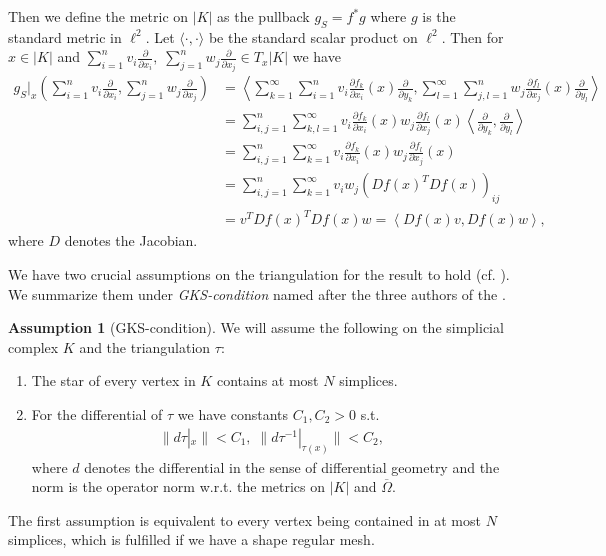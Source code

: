 \documentclass[12pt,a4paper]{article}
\theoremstyle{definition}
\newtheorem{assumption}{Assumption}
\newcommand{\omegabar}{\overline{\Omega}}
\begin{document}
Then we define the metric on $|K|$ as the pullback $g_S = f^*g$ 
where $g$ is the standard metric in $\ell^2$. Let $\langle \cdot , 
\cdot \rangle$ be the standard scalar product on $\ell^2$. Then for $x \in |K|$ 
and $\sum_{i=1}^n v_i \frac{\partial}{\partial x_i}, \; 
\sum_{j=1}^n w_j \frac{\partial}{\partial x_j} \in T_x |K|$ we have 
\begin{align*}
g_S|_x\left(\sum_{i=1}^n v_i \frac{\partial}{\partial x_i}, 
\sum_{j=1}^n w_j \frac{\partial}{\partial x_j}\right) &= 
\left\langle \sum_{k=1}^\infty \sum_{i=1}^n v_i 
\frac{\partial f_k}{\partial x_i} (x)
\frac{\partial }{\partial y_k}, 
\sum_{l=1}^\infty \sum_{j,l=1}^n w_j \frac{\partial f_l}{\partial x_j} (x)
\frac{\partial }{\partial y_l} \right\rangle \\   
&= \sum_{i,j=1}^n \sum_{k,l=1}^\infty v_i \frac{\partial f_k}{\partial x_i} (x)
w_j \frac{\partial f_l}{\partial x_j} (x) 
\left\langle \frac{\partial }{\partial y_k}, \frac{\partial }{\partial y_l} 
\right\rangle\\
&= \sum_{i,j=1}^n \sum_{k=1}^\infty v_i \frac{\partial f_k}{\partial x_i} (x)
w_j \frac{\partial f_l}{\partial x_j} (x)\\
&= \sum_{i,j=1}^n \sum_{k=1}^\infty v_i w_j \left( Df(x)^T Df(x) \right)_{ij} \\
&= v^T Df(x)^T Df(x) w = \left\langle Df(x) v, Df(x) w \right\rangle,
\end{align*}
where $D$ denotes the Jacobian.

We have two crucial assumptions on the triangulation for the result to hold 
(cf. \cite[p.194]{goldshtein}). We summarize them under 
\textit{GKS-condition} named after the three authors of the \cite{goldshtein}.

\begin{assumption}[GKS-condition]
    We will assume the following on the simplicial complex $K$ 
    and the triangulation $\tau$:
    \begin{enumerate}
    \item The star of every vertex in $K$ contains at most $N$ simplices.
    \item For the differential of $\tau$ we have constants 
        $C_1, C_2 > 0$ s.t.
        \begin{align*}
        \lVert d\tau|_x \rVert < C_1, \; 
        \lVert d\tau^{-1}|_{\tau(x)} \rVert < C_2,
        \end{align*}
        where $d$ denotes the differential in the sense of differential 
        geometry and the norm is the operator norm w.r.t. the metrics on $|K|$ 
        and $\omegabar$.
    \end{enumerate}
\end{assumption}
The first assumption is equivalent to every vertex being contained in
at most $N$ simplices, which is fulfilled if we have a shape regular mesh.\par
\end{document}
